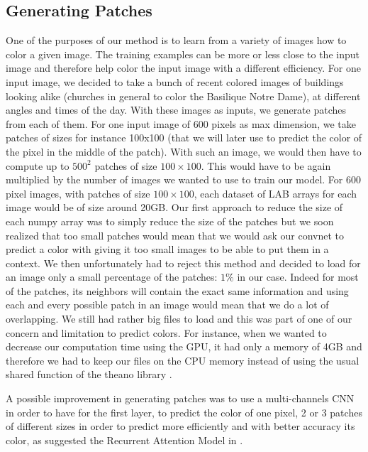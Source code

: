 \documentclass[10pt,twocolumn]{article}
\begin{document}
\subsection{Generating Patches}

One of the purposes of our method is to learn from a variety of images how to color a given image. The training examples can be more or less close to the input image and therefore help color the input image with a different efficiency.
For one input image, we decided to take a bunch of recent colored images of buildings looking alike (churches in general to color the Basilique Notre Dame), at different angles and times of the day. With these images as inputs, we generate patches from each of them. For one input image of 600 pixels as max dimension, we take patches of sizes for instance 100x100 (that we will later use to predict the color of the pixel in the middle of the patch). With such an image, we would then have to compute up to $500^2$ patches of size $100 \times100$. This would have to be again multiplied by the number of images we wanted to use to train our model. For 600 pixel images, with patches of size $100 \times100$, each dataset of LAB arrays for each image would be of size around 20GB. Our first approach to reduce the size of each numpy array was to simply reduce the size of the patches but we soon realized that too small patches would mean that we would ask our convnet to predict a color with giving it too small images to be able to put them in a context. We then unfortunately had to reject this method and decided to load for an image only a small percentage of the patches: $1\%$ in our case. Indeed for most of the patches, its neighbors will contain the exact same information and using each and every possible patch in an image would mean that we do a lot of overlapping. We still had rather big files to load and this was part of one of our concern and limitation to predict colors. For instance, when we wanted to decrease our computation time using the GPU, it had only a memory of 4GB and therefore we had to keep our files on the CPU memory instead of using the usual shared function of the theano library \cite{theano1} \cite{theano2}.

A possible improvement in generating patches was to use a multi-channels CNN in order to have for the first layer, to predict the color of one pixel, 2 or 3 patches of different sizes in order to predict more efficiently and with better accuracy its color, as suggested the Recurrent Attention Model in \cite{http://arxiv.org/pdf/1406.6247v1.pdf}.
\end{document}
